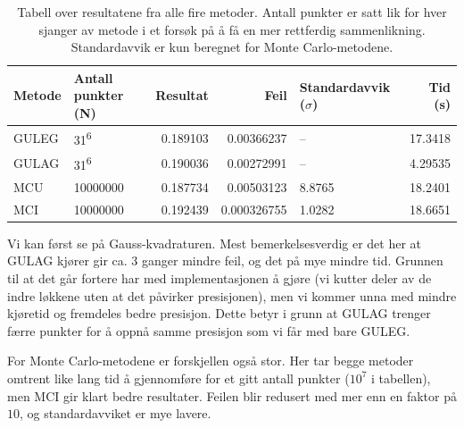 \documentclass[11pt]{article}
\begin{document}
\begin{table}[ht]
\centering
\caption{\label{tab:1} Tabell over resultatene fra alle fire
  metoder. Antall punkter er satt lik for hver sjanger av metode i et
  forsøk på å få en mer rettferdig sammenlikning. Standardavvik er kun beregnet for Monte
  Carlo-metodene.}
\vspace{0.5cm}
\begin{tabular}{llrrlr}
Metode & Antall punkter (N) & Resultat & Feil & Standardavvik ($\sigma$) & Tid (s) \\
\hline
GULEG & 31\textsuperscript{6} & 0.189103 & 0.00366237 & -- & 17.3418 \\
GULAG & 31\textsuperscript{6} & 0.190036 & 0.00272991 & -- & 4.29535 \\
MCU & \num{10000000} & 0.187734 & 0.00503123 & 8.8765 & 18.2401 \\
MCI & \num{10000000} & 0.192439 & 0.000326755 & 1.0282 & 18.6651 \\
\end{tabular}
\end{table}

Vi kan først se på Gauss-kvadraturen. Mest bemerkelsesverdig er det
her at GULAG kjører gir ca. 3 ganger mindre feil, og det på mye mindre
tid. Grunnen til at det går fortere har med implementasjonen å gjøre
(vi kutter deler av de indre løkkene uten at det påvirker
presisjonen), men vi kommer unna med mindre kjøretid og fremdeles
bedre presisjon. Dette betyr i grunn at GULAG trenger færre punkter
for å oppnå samme presisjon som vi får med bare GULEG. 

For Monte Carlo-metodene er forskjellen også stor. Her tar begge
metoder omtrent like lang tid å gjennomføre for et gitt antall punkter
($10^7$ i tabellen), men MCI gir klart bedre resultater. Feilen blir
redusert med mer enn en faktor på $10$, og standardavviket er mye
lavere. 
\end{document}

